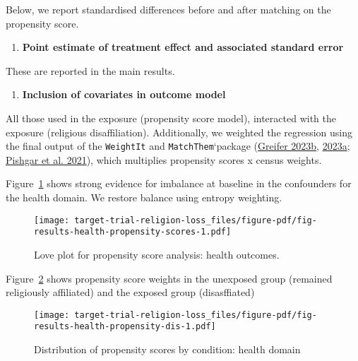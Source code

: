 \documentclass[
  singlecolumn]{report}
\providecommand{\tightlist}{%
  \setlength{\itemsep}{0pt}\setlength{\parskip}{0pt}}\usepackage{longtable,booktabs,array}
\begin{document}
Below, we report standardised differences before and after matching on
the propensity score.

\begin{enumerate}
\def\labelenumi{\arabic{enumi}.}
\setcounter{enumi}{9}
\tightlist
\item
  \textbf{Point estimate of treatment effect and associated standard
  error}
\end{enumerate}

These are reported in the main results.

\begin{enumerate}
\def\labelenumi{\arabic{enumi}.}
\setcounter{enumi}{10}
\tightlist
\item
  \textbf{Inclusion of covariates in outcome model}
\end{enumerate}

All those used in the exposure (propensity score model), interacted with
the exposure (religious disaffiliation). Additionally, we weighted the
regression using the final output of the \texttt{WeightIt} and
\texttt{MatchThem}`package (\protect\hyperlink{ref-greifer2023a}{Greifer
2023b}, \protect\hyperlink{ref-greifer2023b}{2023a};
\protect\hyperlink{ref-pishgar2021}{Pishgar et al. 2021}), which
multiplies propensity scores x census weights.

Figure~\ref{fig-results-health-propensity-scores} shows strong evidence
for imbalance at baseline in the confounders for the health domain. We
restore balance using entropy weighting.

\begin{figure}

{\centering \texttt{[image: target-trial-religion-loss\_files/figure-pdf/fig-results-health-propensity-scores-1.pdf]}

}

\caption{\label{fig-results-health-propensity-scores}Love plot for
propensity score analysis: health outcomes.}

\end{figure}

Figure~\ref{fig-results-health-propensity-dis} shows propensity score
weights in the unexposed group (remained religiously affiliated) and the
exposed group (disasffiated)

\begin{figure}

{\centering \texttt{[image: target-trial-religion-loss\_files/figure-pdf/fig-results-health-propensity-dis-1.pdf]}

}

\caption{\label{fig-results-health-propensity-dis}Distribution of
propensity scores by condition: health domain}

\end{figure}
\end{document}
